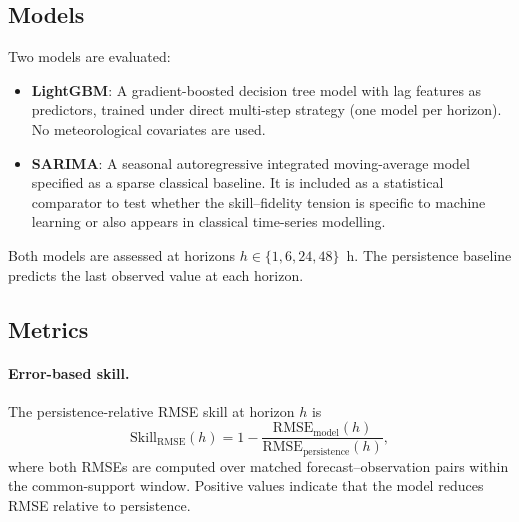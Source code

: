 \documentclass[12pt]{article}
\begin{document}
\subsection{Models}
\label{sec:models}

Two models are evaluated:

\begin{itemize}
\item \textbf{LightGBM}: A gradient-boosted decision tree model
  with lag features as predictors, trained under direct multi-step
  strategy (one model per horizon). No meteorological covariates
  are used.
\item \textbf{SARIMA}: A seasonal autoregressive integrated
  moving-average model specified as a sparse classical baseline.
  It is included as a statistical comparator to test whether the
  skill--fidelity tension is specific to machine learning or also
  appears in classical time-series modelling.
\end{itemize}

Both models are assessed at horizons $h \in \{1, 6, 24, 48\}$~h.
The persistence baseline predicts the last observed value at each
horizon.

\subsection{Metrics}
\label{sec:metrics}

\paragraph{Error-based skill.}
The persistence-relative RMSE skill at horizon $h$ is
\begin{equation}
  \label{eq:skill_rmse}
  \mathrm{Skill}_\mathrm{RMSE}(h)
    = 1 - \frac{\mathrm{RMSE}_\mathrm{model}(h)}{\mathrm{RMSE}_\mathrm{persistence}(h)},
\end{equation}
where both RMSEs are computed over matched forecast--observation pairs
within the common-support window. Positive values indicate that the
model reduces RMSE relative to persistence.
\end{document}
